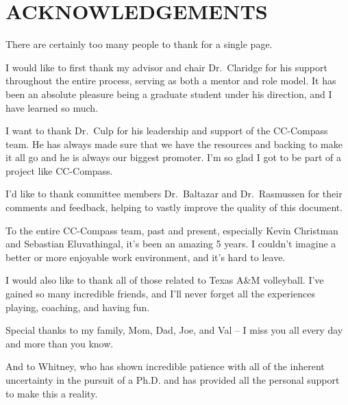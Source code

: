 %
%
%


\chapter*{\texorpdfstring{\MakeUppercase{ACKNOWLEDGEMENTS}}{ACKNOWLEDGEMENTS}}


There are certainly too many people to thank for a single page.

I would like to first thank my advisor and chair Dr.\ Claridge for his
support throughout the entire process, serving as both a mentor and role
model. It has been an absolute pleasure being a graduate student under
his direction, and I have learned so much. 

I want to thank Dr.\ Culp for his leadership and support of the CC-Compass team.
He has always made sure that we have the resources and backing to make
it all go and he is always our biggest promoter. I'm so glad I got to be part
of a project like CC-Compass.

I'd like to thank committee members Dr.\ Baltazar and Dr.\ Rasmussen for
their comments and feedback, helping to vastly improve the quality of
this document.

To the entire CC-Compass team, past and present, especially Kevin
Christman and Sebastian Eluvathingal, it's been an amazing 5 years. I
couldn't imagine a better or more enjoyable work environment, and it's
hard to leave. 

I would also like to thank all of those related to Texas A\&M
volleyball. I've gained so many incredible friends, and I'll never forget
all the experiences playing, coaching, and having fun. 

Special thanks to my family, Mom, Dad, Joe, and Val -- I miss you all
every day and more than you know.

And to Whitney, who has shown incredible patience with all of the
inherent uncertainty in the pursuit of a Ph.D. and has provided all the
personal support to make this a reality.

\pagebreak{}
